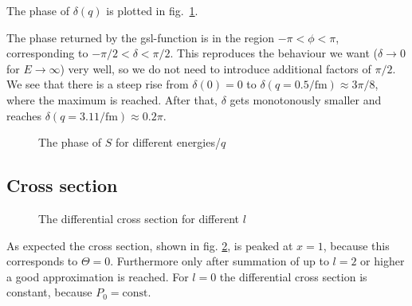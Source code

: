 \documentclass{scrartcl}
\begin{document}
The phase of $\delta(q)$ is plotted in fig.~\ref{fig:delta}.

The phase returned by the gsl-function is in the region $-\pi<\phi<\pi$, corresponding to $-\pi/2<\delta<\pi/2$. This reproduces the behaviour we want ($\delta\to 0$ for $E\to\infty$) very well, so we do not need to introduce additional factors of $\pi/2$. We see that there is a steep rise from $\delta(0)=0$ to $\delta(q=0.5\si{\per\femto\meter})\approx 3\pi/8$, where the maximum is reached. After that, $\delta$ gets monotonously smaller and reaches $\delta(q=3.11\si{\per\femto\meter})\approx 0.2\pi$.

\begin{figure}[htbp]
	
	\caption{The phase of $S$ for different energies/$q$}
	\label{fig:delta}
\end{figure}

\subsection{Cross section}

\begin{figure}[htbp]
	
	\caption{The differential cross section for different $l$}
	\label{fig:crossect}
\end{figure}
As expected the cross section, shown in fig. \ref{fig:crossect}, is peaked at $x=1$, because this corresponds to $\Theta=0$. Furthermore only after summation of up to $l=2$ or higher a good approximation is reached. For $l=0$ the differential cross section is constant, because $P_0=\text{const}$.
\newpage
\listoffigures
\printbibliography
\end{document}
